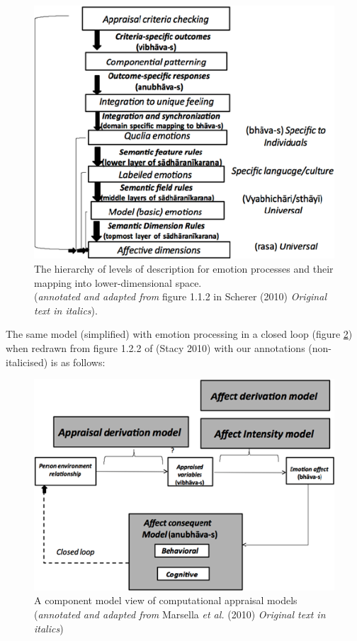 \begin{figure}[H]
\centering
\includegraphics[scale=.9]{figures/3.eps}
\caption{The hierarchy of levels of description for emotion processes and their mapping into lower-dimensional space.\\
(\textsl{annotated and adapted from} figure 1.1.2 in Scherer (2010) \textsl{Original text in italics}).}\label{chap3-fig1}
\end{figure}

The same model (simplified) with emotion processing in a closed loop (figure \ref{chap3-fig2}) when redrawn from figure 1.2.2 of (Stacy 2010) with our annotations (non-italicised) is as follows:

\begin{figure}[H]
\centering
\includegraphics[scale=.9]{figures/4.eps}
\caption{A component model view of computational appraisal models (\textsl{annotated and adapted from} Marsella \textsl{et al.} (2010) \textsl{Original text in italics})}\label{chap3-fig2}
\end{figure}

